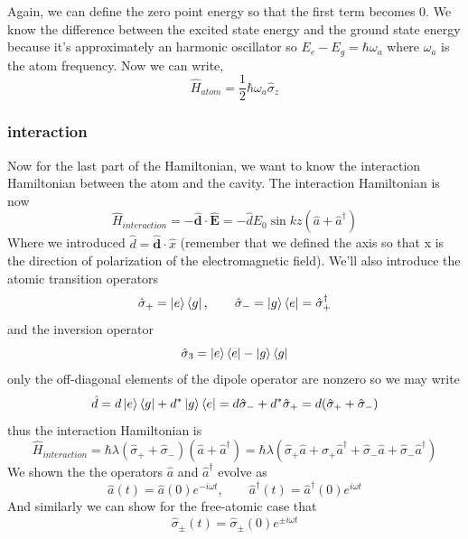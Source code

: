 \documentclass[english, a4paper, 12pt, twoside]{article}
\numberwithin{equation}{section} %
\begin{document}
Again, we can define the zero point energy so that the first term becomes $0$. We know the difference between the excited state energy and the ground state energy because it's approximately an harmonic oscillator so $E_e - E_g = \hbar\omega_a$ where $\omega_a$ is the atom frequency. Now we can write,
\begin{equation}
    \boxed{\hat{H}_{atom} = \frac{1}{2}\hbar\omega_a\hat{\sigma}_z}
\end{equation}

\subsubsection{interaction}

Now for the last part of the Hamiltonian, we want to know the interaction Hamiltonian between the atom and the cavity. The interaction Hamiltonian is now 
\[
\hat{H}_{interaction} = -\hat{\textbf{d}}\cdot\hat{\textbf{E}} = -\hat{d} E_0 \sin{kz} (\hat{a} + \hat{a}^\dag{})
\]
Where we introduced $\hat{d} = \hat{\textbf{d}} \cdot \hat{x}$ (remember that we defined the axis so that x is the direction of polarization of the electromagnetic field).
We'll also introduce the atomic transition operators
\[
    \hat{\sigma}_+ = \ket{e}\bra{g}, \quad\quad \hat{\sigma}_- = \ket{g}\bra{e} = \hat{\sigma}_+^{\dag{}}
\]
and the inversion operator
\[
\hat{\sigma}_3 = \ket{e}\bra{e} - \ket{g}\bra{g}
\]
only the off-diagonal elements of the dipole operator are nonzero so we may write
\[
    \hat{d} = d\ket{e}\bra{g} + d^* \ket{g}\bra{e} = d\hat{\sigma}_- + d^* \hat{\sigma}_+ = d(\hat{\sigma}_+ + \hat{\sigma}_-)
\]
thus the interaction Hamiltonian is
\begin{equation}
    \hat{H}_{interaction} = \hbar\lambda(\hat{\sigma}_+ + \hat{\sigma}_-)(\hat{a} +  \hat{a}^\dag) 
    = \hbar\lambda(\hat{\sigma}_+\hat{a} + \hat{\sigma}_+\hat{a}^\dag + \hat{\sigma}_-\hat{a} + \hat{\sigma}_-\hat{a}^\dag) 
\end{equation}
We shown the the operators $\hat{a}$ and $\hat{a}^\dag{}$ evolve as
\begin{equation}
    \hat{a}(t) = \hat{a}(0)e^{-i\omega t}, \quad\quad \hat{a}^\dag{}(t) = \hat{a}^\dag{}(0)e^{i\omega t}
\end{equation}
And similarly we can show for the free-atomic case that
\begin{equation}
    \hat{\sigma}_{\pm}(t) =   \hat{\sigma}_{\pm}(0)e^{\pm i\omega t}
\end{equation}
\end{document}
